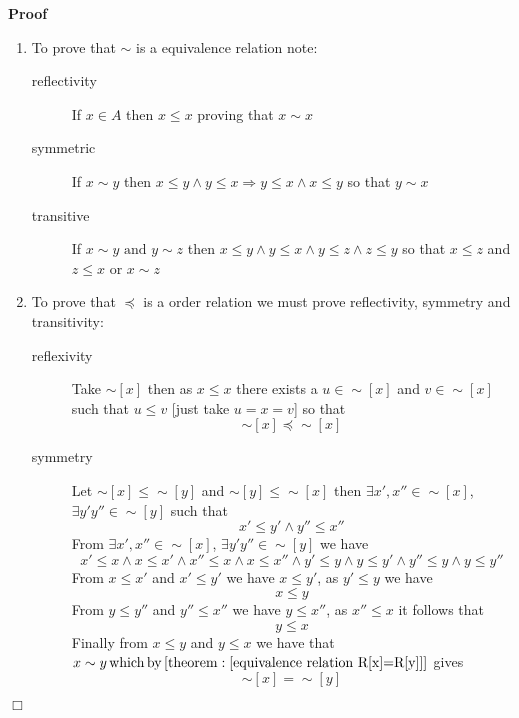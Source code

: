 \documentclass{book}
\newcommand{\infixand}{\text{ and }}
\newcommand{\tmop}[1]{\ensuremath{\operatorname{#1}}}
\newenvironment{proof}{\noindent\textbf{Proof\ }}{\hspace*{\fill}$\Box$\medskip}
\begin{document}
\begin{proof}
  
  \begin{enumerate}
    \item To prove that $\sim$ is a equivalence relation note:
    \begin{description}
      \item[reflectivity] If $x \in A$ then $x \leqslant x$ proving that $x
      \sim x$
      
      \item[symmetric] If $x \sim y$ then $x \leqslant y \wedge y \leqslant x
      \Rightarrow y \leqslant x \wedge x \leqslant y$ so that $y \sim x$
      
      \item[transitive] If $x \sim y \infixand y \sim z$ then $x \leqslant y
      \wedge y \leqslant x \wedge y \leqslant z \wedge z \leqslant y$ so that
      $x \leqslant z$ and $z \leqslant x$ or $x \sim z$
    \end{description}
    \item To prove that $\preccurlyeq$ is a order relation we must prove
    reflectivity, symmetry and transitivity:
    \begin{description}
      \item[reflexivity] Take $\sim [x]$ then as $x \leqslant x$ there exists
      a $u \in \sim [x]$ and $v \in \sim [x]$ such that $u \leqslant v$ [just
      take $u = x = v$] so that
      \[ \sim [x] \preccurlyeq \sim [x] \]
      \item[symmetry] Let $\sim [x] \leqslant \sim [y]$ and $\sim [y]
      \leqslant \sim [x]$ then $\exists x', x'' \in \sim [x]$, $\exists y' y''
      \in \sim [y]$ such that
      \[ x' \leqslant y' \wedge y'' \leqslant x'' \]
      From $\exists x', x'' \in \sim [x]$, $\exists y' y'' \in \sim [y]$ we
      have
      \[ x' \leqslant x \wedge x \leqslant x' \wedge x'' \leqslant x \wedge x
         \leqslant x'' \wedge y' \leqslant y \wedge y \leqslant y' \wedge y''
         \leqslant y \wedge y \leqslant y'' \]
      From $x \leqslant x'$ and $x' \leqslant y'$ we have $x \leqslant y'$, as
      $y' \leqslant y$ we have
      \[ x \leqslant y \]
      From $y \leqslant y''$ and $y'' \leqslant x''$ we have $y \leqslant
      x''$, as $x'' \leqslant x$ it follows that
      \[ y \leqslant x \]
      Finally from $x \leqslant y$ and $y \leqslant x$ we have that $x \sim y
      \tmop{which} \tmop{by} \left[ \tmop{theorem} : \ref{equivalence relation
      R[x]=R[y]} \right]$ gives
      \[ \sim [x] = \sim [y] \]

\end{description}
\end{enumerate}
\end{proof}
\end{document}
